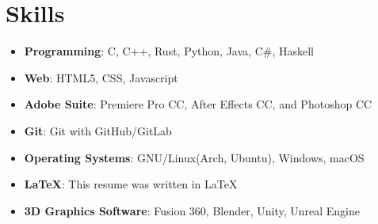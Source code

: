 \documentclass[letterpaper,12pt]{article}
\newcommand{\resumeItem}[2]{
  \item\small{
    \textbf{#1}{: #2 \vspace{-2pt}}
  }
}
\newcommand{\resumeSubItem}[2]{\resumeItem{#1}{#2}\vspace{-4pt}}
\newcommand{\resumeSubHeadingListStart}{\begin{itemize}[leftmargin=*]}
\newcommand{\resumeSubHeadingListEnd}{\end{itemize}}
\begin{document}
\section{Skills}
  \resumeSubHeadingListStart
    \resumeSubItem{Programming}
      {C, C++, Rust, Python, Java, C\#, Haskell}
      \resumeSubItem{Web}
      {HTML5, CSS, Javascript} 
    \resumeSubItem{Adobe Suite}
      {Premiere Pro CC, After Effects CC, and Photoshop CC}
    \resumeSubItem{Git}
      {Git with GitHub/GitLab}
    \resumeSubItem{Operating Systems}
    {GNU/Linux(Arch, Ubuntu), Windows, macOS}
    \resumeSubItem{\LaTeX}
      {This resume was written in \LaTeX}
    \resumeSubItem{3D Graphics Software}
      {Fusion 360, Blender, Unity, Unreal Engine}
  \resumeSubHeadingListEnd
\end{document}
